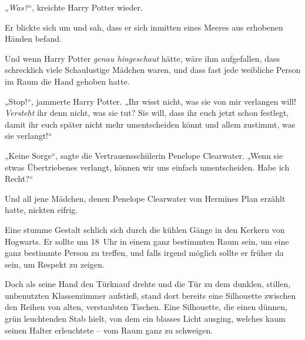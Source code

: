 „\emph{Was?}“, kreichte Harry Potter wieder.

Er blickte sich um und sah, dass er sich inmitten eines Meeres aus erhobenen Händen befand.

Und wenn Harry Potter \emph{genau hingeschaut} hätte, wäre ihm aufgefallen, dass schrecklich viele Schaulustige Mädchen waren, und dass fast jede weibliche Person im Raum die Hand gehoben hatte.

„Stop!“, jammerte Harry Potter. „Ihr wisst nicht, was sie von mir verlangen will! \emph{Versteht} ihr denn nicht, was sie tut? Sie will, dass ihr euch jetzt schon festlegt, damit ihr euch später nicht mehr umentscheiden könnt und allem zustimmt, was sie verlangt!“

„Keine Sorge“, sagte die Vertrauensschülerin Penelope Clearwater. „Wenn sie etwas Übertriebenes verlangt, können wir uns einfach umentscheiden. Habe ich Recht?“

Und all jene Mädchen, denen Penelope Clearwater von Hermines Plan erzählt hatte, nickten eifrig.

\later

Eine stumme Gestalt schlich sich durch die kühlen Gänge in den Kerkern von Hogwarts. Er sollte um 18~Uhr in einem ganz bestimmten Raum sein, um eine ganz bestimmte Person zu treffen, und falls irgend möglich sollte er früher da sein, um Respekt zu zeigen.

Doch als seine Hand den Türknauf drehte und die Tür zu dem dunklen, stillen, unbenutzten Klassenzimmer aufstieß, stand dort bereits eine Silhouette zwischen den Reihen von alten, verstaubten Tischen. Eine Silhouette, die einen dünnen, grün leuchtenden Stab hielt, von dem ein blasses Licht ausging, welches kaum seinen Halter erleuchtete – vom Raum ganz zu schweigen.


